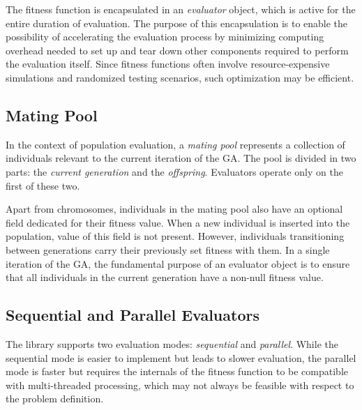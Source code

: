 The fitness function is encapsulated in an \textit{evaluator} object, which is active for the entire duration of evaluation. The purpose of this encapsulation is to enable the possibility of accelerating the evaluation process by minimizing computing overhead needed to set up and tear down other components required to perform the evaluation itself. Since fitness functions often involve resource-expensive simulations and randomized testing scenarios, such optimization may be efficient.

\subsection{Mating Pool}
In the context of population evaluation, a \textit{mating pool} represents a collection of individuals relevant to the current iteration of the GA. The pool is divided in two parts: the \textit{current generation} and the \textit{offspring}. Evaluators operate only on the first of these two.

Apart from chromosomes, individuals in the mating pool also have an optional field dedicated for their fitness value. When a new individual is inserted into the population, value of this field is not present. However, individuals transitioning between generations carry their previously set fitness with them. In a single iteration of the GA, the fundamental purpose of an evaluator object is to ensure that all individuals in the current generation have a non-null fitness value.

\subsection{Sequential and Parallel Evaluators}
The library supports two evaluation modes: \textit{sequential} and \textit{parallel}. While the sequential mode is easier to implement but leads to slower evaluation, the parallel mode is faster but requires the internals of the fitness function to be compatible with multi-threaded processing, which may not always be feasible with respect to the problem definition.

